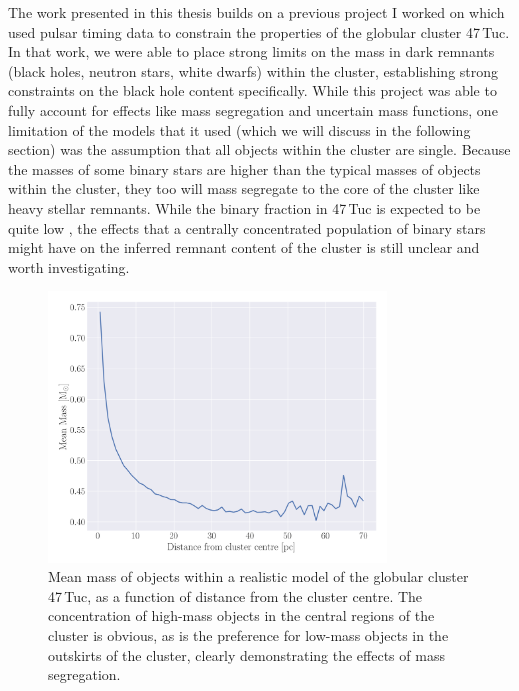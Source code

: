 The work presented in this thesis builds on a previous project I worked on which used pulsar timing
data to constrain the properties of the globular cluster 47\,Tuc. In that work, we were able to
place strong limits on the mass in dark remnants (black holes, neutron stars, white dwarfs) within
the cluster, establishing strong constraints on the black hole content specifically. While this
project was able to fully account for effects like mass segregation and uncertain mass functions,
one limitation of the models that it used (which we will discuss in the following section) was the
assumption that all objects within the cluster are single. Because the masses of some binary stars
are higher than the typical masses of objects within the cluster, they too will mass segregate to
the core of the cluster like heavy stellar remnants. While the binary fraction in 47\,Tuc is
expected to be quite low \citep{Milone2012}, the effects that a centrally concentrated population of
binary stars might have on the inferred remnant content of the cluster is still unclear and worth
investigating.



\begin{figure}
	\centering
	\includegraphics[width=0.8\textwidth]{figures/radial_mean_mass.png}
	\caption{Mean mass of objects within a realistic model of the globular cluster 47\,Tuc, as a
		function of distance from the cluster centre. The concentration of high-mass objects
		in the central regions of the cluster is obvious, as is the preference for low-mass
		objects in the outskirts of the cluster, clearly demonstrating the effects of mass
		segregation.}
	\label{fig:1/radial_mean_mass}
\end{figure}




